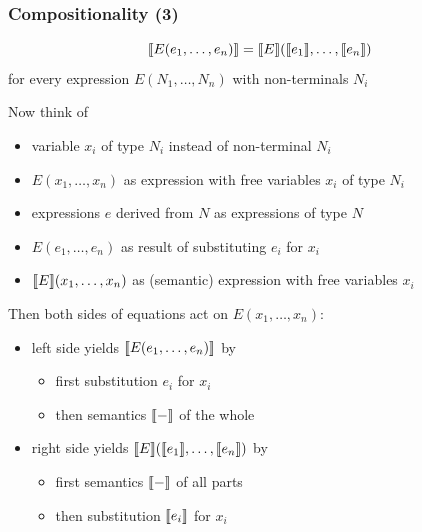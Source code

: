 \begin{frame}\frametitle{Compositionality (3)}
\[\llbracket E(e_1,\ldots,e_n)\rrbracket=\llbracket E\rrbracket(\llbracket e_1\rrbracket,\ldots,\llbracket e_n\rrbracket)\]
for every expression $E(N_1,\ldots,N_n)$ with non-terminals $N_i$
\bigskip

Now think of
\begin{itemize}
\item variable $x_i$ of type $N_i$ instead of non-terminal $N_i$
\item $E(x_1,\ldots,x_n)$ as expression with free variables $x_i$ of type $N_i$
\item expressions $e$ derived from $N$ as expressions of type $N$
\item $E(e_1,\ldots,e_n)$ as result of substituting $e_i$ for $x_i$
\item $\llbracket E\rrbracket(x_1,\ldots,x_n)$ as (semantic) expression with free variables $x_i$
\end{itemize}

Then both sides of equations act on $E(x_1,\ldots,x_n)$:
\begin{itemize}
\item left side yields $\llbracket E(e_1,\ldots,e_n)\rrbracket$ by
\begin{itemize}
\item first substitution $e_i$ for $x_i$
\item then semantics $\llbracket -\rrbracket$ of the whole
\end{itemize}
\item right side yields $\llbracket E\rrbracket(\llbracket e_1\rrbracket,\ldots,\llbracket e_n\rrbracket)$ by
\begin{itemize}
\item first semantics $\llbracket -\rrbracket$ of all parts
\item then substitution $\llbracket e_i\rrbracket$ for $x_i$
\end{itemize}
\end{itemize}
\end{frame}

